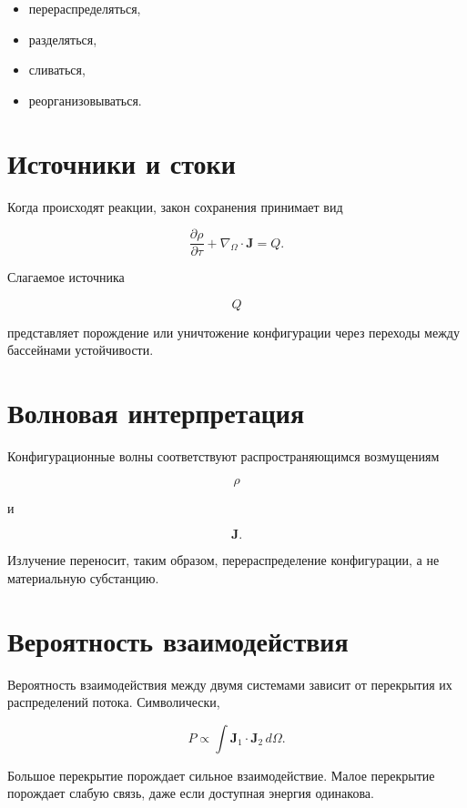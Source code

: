 \begin{itemize}

\item перераспределяться,

\item разделяться,

\item сливаться,

\item реорганизовываться.

\end{itemize}

\section{Источники и стоки}

Когда происходят реакции, закон сохранения принимает вид

\[ \boxed{ \frac{\partial\rho}{\partial\tau} + \nabla_\Omega\cdot\mathbf J = Q. } \]

Слагаемое источника

\[ Q \]

представляет порождение или уничтожение конфигурации через переходы между бассейнами устойчивости.

\section{Волновая интерпретация}

Конфигурационные волны соответствуют распространяющимся возмущениям

\[ \rho \]

и

\[ \mathbf J. \]

Излучение переносит, таким образом, перераспределение конфигурации, а не материальную субстанцию.

\section{Вероятность взаимодействия}

Вероятность взаимодействия между двумя системами зависит от перекрытия их распределений потока. Символически,

\[ \boxed{ P \propto \int \mathbf J_1 \cdot \mathbf J_2 \,d\Omega. } \]

Большое перекрытие порождает сильное взаимодействие. Малое перекрытие порождает слабую связь, даже если доступная энергия одинакова.

